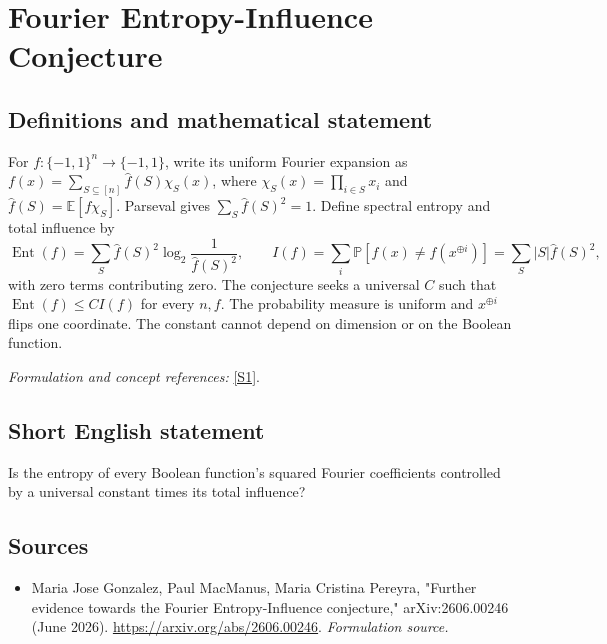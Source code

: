 \documentclass[11pt]{article}
\begin{document}
\section*{\texorpdfstring{Fourier Entropy-Influence Conjecture}{Fourier Entropy-Influence Conjecture}}\label{30006914}
\subsection{Definitions and mathematical statement}
For $f:\{-1,1\}^n\to\{-1,1\}$, write its uniform Fourier expansion as $f(x)=\sum_{S\subseteq[n]}\widehat f(S)\chi_S(x)$, where $\chi_S(x)=\prod_{i\in S}x_i$ and $\widehat f(S)={\mathbb{E}}[f\chi_S]$. Parseval gives $\sum_S\widehat f(S)^2=1$. Define spectral entropy and total influence by
\[
 \operatorname{Ent}(f)=\sum_S\widehat f(S)^2
 \log_2\frac1{\widehat f(S)^2},\qquad
 I(f)=\sum_i{\mathbb{P}}[f(x)\ne f(x^{\oplus i})]
 =\sum_S|S|\widehat f(S)^2,
\]
with zero terms contributing zero. The conjecture seeks a universal $C$ such that $\operatorname{Ent}(f)\le C I(f)$ for every $n,f$. The probability measure is uniform and $x^{\oplus i}$ flips one coordinate. The constant cannot depend on dimension or on the Boolean function.
\par\smallskip\textit{Formulation and concept references:} \href{https://arxiv.org/abs/2606.00246}{[S1]}.

\subsection{Short English statement}
Is the entropy of every Boolean function's squared Fourier coefficients controlled by a universal constant times its total influence?
\subsection{Sources}
\begin{itemize}
\item[S1]Maria Jose Gonzalez, Paul MacManus, Maria Cristina Pereyra, "Further evidence towards the Fourier Entropy-Influence conjecture," arXiv:2606.00246 (June 2026).
\url{https://arxiv.org/abs/2606.00246}.
\textit{Formulation source.}
\end{itemize}
\end{document}
